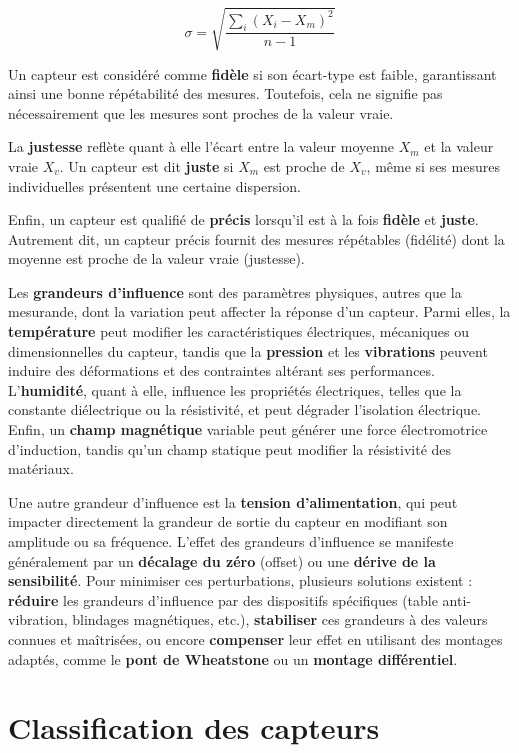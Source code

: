 \[
\sigma = \sqrt{\frac{\sum_{i} (X_i - X_m)^2}{n-1}}
\]

Un capteur est considéré comme \textbf{fidèle} si son écart-type est faible, 
garantissant ainsi une bonne répétabilité des mesures. Toutefois, cela ne 
signifie pas nécessairement que les mesures sont proches de la valeur vraie.  

La \textbf{justesse} reflète quant à elle l'écart entre la valeur moyenne 
\( X_m \) et la valeur vraie \( X_v \). Un capteur est dit \textbf{juste} si 
\( X_m \) est proche de \( X_v \), même si ses mesures individuelles présentent 
une certaine dispersion.  

Enfin, un capteur est qualifié de \textbf{précis} lorsqu'il est à la fois 
\textbf{fidèle} et \textbf{juste}. Autrement dit, un capteur précis fournit 
des mesures répétables (fidélité) dont la moyenne est proche de la valeur vraie 
(justesse).

Les \textbf{grandeurs d'influence} sont des paramètres physiques, autres que la 
mesurande, dont la variation peut affecter la réponse d'un capteur. Parmi elles, 
la \textbf{température} peut modifier les caractéristiques électriques, 
mécaniques ou dimensionnelles du capteur, tandis que la \textbf{pression} et les
\textbf{vibrations} peuvent induire des déformations et des contraintes altérant 
ses performances. L'\textbf{humidité}, quant à elle, influence les propriétés 
électriques, telles que la constante diélectrique ou la résistivité, et peut 
dégrader l'isolation électrique. Enfin, un \textbf{champ magnétique} variable 
peut générer une force électromotrice d'induction, tandis qu'un champ statique 
peut modifier la résistivité des matériaux.  

Une autre grandeur d'influence est la \textbf{tension d'alimentation}, qui peut 
impacter directement la grandeur de sortie du capteur en modifiant son amplitude
ou sa fréquence. L'effet des grandeurs d'influence se manifeste généralement par 
un \textbf{décalage du zéro} (offset) ou une \textbf{dérive de la sensibilité}. 
Pour minimiser ces perturbations, plusieurs solutions existent : 
\textbf{réduire} les grandeurs d'influence par des dispositifs spécifiques 
(table anti-vibration, blindages magnétiques, etc.), \textbf{stabiliser} ces 
grandeurs à des valeurs connues et maîtrisées, ou encore \textbf{compenser} leur 
effet en utilisant des montages adaptés, comme le \textbf{pont de Wheatstone} ou 
un \textbf{montage différentiel}.

\section{Classification des capteurs}\label{physique:capteurs:classification}

